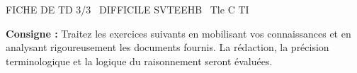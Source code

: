 \documentclass[11pt]{article}
\begin{document}
\begin{tcolorbox}[enhanced,colback=popink,colframe=popink,arc=10pt,boxrule=0pt,left=12pt,right=12pt,top=9pt,bottom=9pt]
{\color{white}\popxbold\small FICHE DE TD 3/3 \textbullet\ DIFFICILE \hfill SVTEEHB \textbullet\ Tle C TI\par}
\end{tcolorbox}
\vspace{4pt}
\noindent \textbf{Consigne :} Traitez les exercices suivants en mobilisant vos connaissances et en analysant rigoureusement les documents fournis. La rédaction, la précision terminologique et la logique du raisonnement seront évaluées.
\end{document}
